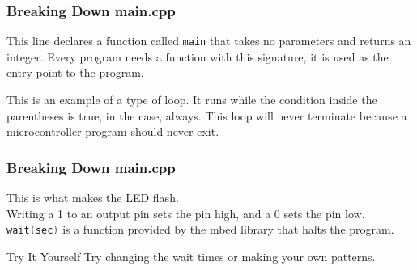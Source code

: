 \begin{frame}[fragile]
	\frametitle{Breaking Down main.cpp}
	
	This line declares a function called \lstinline[language=C++]$main$ that takes no parameters and returns an integer.
	Every program needs a function with this signature, it is used as the entry point to the program.
	
	
	This is an example of a type of loop.
	It runs while the condition inside the parentheses is true, in the case, always.
	This loop will never terminate because a microcontroller program should never exit.
\end{frame}

\begin{frame}[fragile]
	\frametitle{Breaking Down main.cpp}
	
	This is what makes the LED flash.\\
	Writing a 1 to an output pin sets the pin high, and a 0 sets the pin low.
	\lstinline[language=C++]$wait(sec)$ is a function provided by the mbed library that halts the program.
	\begin{block}{Try It Yourself}
		Try changing the wait times or making your own patterns.
	\end{block}
\end{frame}